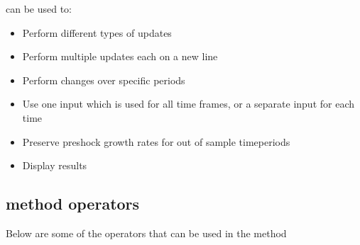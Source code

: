 \documentclass[letterpaper,10pt,english]{jupyterBook}
\begin{document}
\sphinxAtStartPar
{} can be used to:
\begin{itemize}
\item {} 
\sphinxAtStartPar
Perform different types of  updates

\item {} 
\sphinxAtStartPar
Perform multiple updates each on a new line

\item {} 
\sphinxAtStartPar
Perform changes over specific periods

\item {} 
\sphinxAtStartPar
Use one input which is used for all time frames, or a separate input for each time

\item {} 
\sphinxAtStartPar
Preserve pre\sphinxhyphen{}shock growth rates for out of sample time\sphinxhyphen{}periods

\item {} 
\sphinxAtStartPar
Display results

\end{itemize}


\subsection{ method operators}
\label{\detokenize{content/04_PythonEssentials/UpdateCommand:upd-method-operators}}
\sphinxAtStartPar
Below are some of the operators that can be used in the  method

\sphinxAtStartPar
{}
\end{document}
